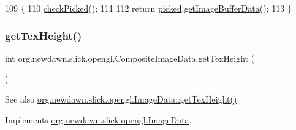 \begin{DoxyCode}
109                                            \{
110         \mbox{\hyperlink{classorg_1_1newdawn_1_1slick_1_1opengl_1_1_composite_image_data_a1a95487f3cd09ae6bf1458ffa1d433b8}{checkPicked}}();
111         
112         \textcolor{keywordflow}{return} \mbox{\hyperlink{classorg_1_1newdawn_1_1slick_1_1opengl_1_1_composite_image_data_a7238cbb20cc08b68a29935b4bc222da7}{picked}}.\mbox{\hyperlink{interfaceorg_1_1newdawn_1_1slick_1_1opengl_1_1_image_data_a7b15d49f552cad075bb1179668ce5250}{getImageBufferData}}();
113     \}
\end{DoxyCode}
\mbox{\label{classorg_1_1newdawn_1_1slick_1_1opengl_1_1_composite_image_data_ac0733bc4b03bf553a9374b858343a0f0}} 
\subsubsection{\texorpdfstring{get\+Tex\+Height()}{getTexHeight()}}
{\footnotesize\ttfamily int org.\+newdawn.\+slick.\+opengl.\+Composite\+Image\+Data.\+get\+Tex\+Height (\begin{DoxyParamCaption}{ }\end{DoxyParamCaption})\hspace{0.3cm}{\ttfamily [inline]}}

\begin{DoxySeeAlso}{See also}
\mbox{\hyperlink{interfaceorg_1_1newdawn_1_1slick_1_1opengl_1_1_image_data_a316891c94ba43967d0554378c7197324}{org.\+newdawn.\+slick.\+opengl.\+Image\+Data\+::get\+Tex\+Height()}} 
\end{DoxySeeAlso}


Implements \mbox{\hyperlink{interfaceorg_1_1newdawn_1_1slick_1_1opengl_1_1_image_data_a316891c94ba43967d0554378c7197324}{org.\+newdawn.\+slick.\+opengl.\+Image\+Data}}.


